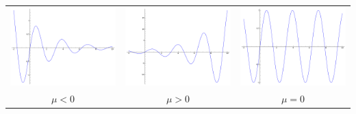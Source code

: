 \begin{enumerate}
\begin{center}
 \begin{tabular}{c c c}
\includegraphics[scale=.1]{imagenes/mu_neg.png} & \includegraphics[scale=.1]{imagenes/mu_pos.png} &
\includegraphics[scale=.1]{imagenes/mu_cero.png}\\
$\mu<0$ & $\mu>0$ & $\mu=0$\\
\end{tabular}


\end{center}
\end{enumerate}
